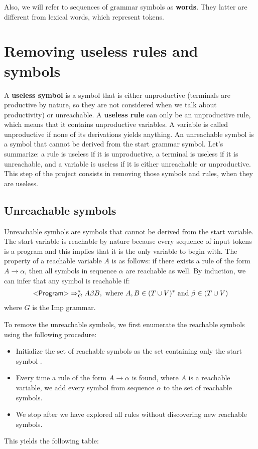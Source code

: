 \documentclass[12pt]{report}
\newcommand{\varstyle}[1]{\notblank{#1}{\textsf{$<$#1$>$}}{}}
\begin{document}
Also, we will refer to sequences of grammar symbols as \textbf{words}. They latter are different from lexical words, which represent tokens.


\section{Removing useless rules and symbols}

A \textbf{useless symbol} is a symbol that is either unproductive (terminals are productive by nature, so they are not considered when we talk about productivity) or unreachable. A \textbf{useless rule} can only be an unproductive rule, which means that it contains
unproductive variables. A variable is called unproductive if none of its derivations yields anything. An unreachable symbol is a symbol that cannot be derived
from the start grammar symbol. Let's summarize: a rule is useless if it is unproductive, a terminal is useless if it is unreachable, and a variable is useless if it is either unreachable or unproductive. This step of the project consists in removing those symbols and rules, when they are useless.

\subsection{Unreachable symbols}

Unreachable symbols are symbols that cannot be derived from the start variable. The start variable \varstyle{Program} is reachable by nature
because every sequence of input tokens is a program and this implies that it is the only variable to begin with. 
The property of a reachable variable $A$ is as follows: if there exists a rule of the form $A \rightarrow \alpha$, then all symbols in sequence $\alpha$
are reachable as well. By induction, we can infer that any symbol is reachable if:
\begin{equation}
  \begin{split}
    \varstyle{Program} \Rightarrow_{G}^{*} A \beta B, \text{ where } A, B \in (T \cup V)^{*} \text{ and } \beta \in (T \cup V)
   \end{split}
\end{equation}
where $G$ is the Imp grammar.

To remove the unreachable symbols, we first enumerate the reachable symbols using the following procedure:
\begin{itemize}
  \item Initialize the set of reachable symbols as the set containing only the start symbol \varstyle{Program}.
  \item Every time a rule of the form $A \rightarrow \alpha$ is found, where $A$ is a reachable variable, we add every symbol from sequence $\alpha$
  to the set of reachable symbols.
  \item We stop after we have explored all rules without discovering new reachable symbols.
\end{itemize}
This yields the following table:
\end{document}
